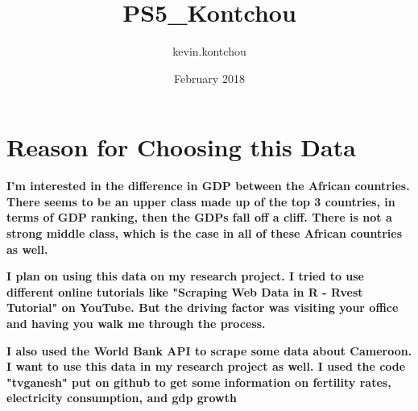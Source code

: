 \documentclass{article}
\title{PS5_Kontchou}
\author{kevin.kontchou }
\date{February 2018}
\begin{document}
\maketitle{}  

\section{Reason for Choosing this Data}

\textbf{I'm interested in the difference in GDP between the African countries. There seems to be an upper class made up of the top 3 countries, in terms of GDP ranking, then the GDPs fall off a cliff. There is not a strong middle class, which is the case in all of these African countries as well.} 

\textbf{
I plan on using this data on my research project. I tried to use different online tutorials like "Scraping Web Data in R - Rvest Tutorial" on YouTube. But the driving factor was visiting your office and having you walk me through the process.}

\textbf{I also used the World Bank API to scrape some data about Cameroon. I want to use this data in my research project as well. I used the code "tvganesh" put on github to get some information on fertility rates, electricity consumption, and gdp growth}
\end{document}
